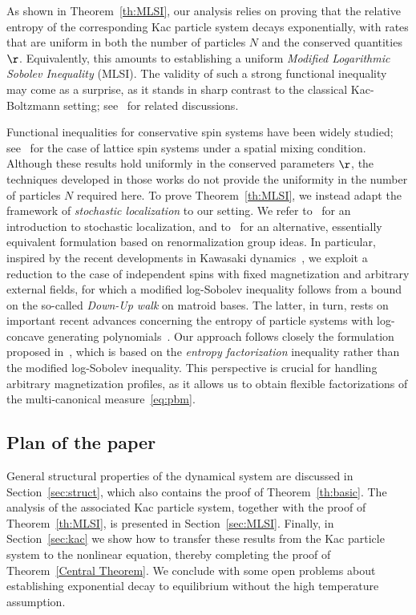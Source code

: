 \documentclass[11pt,reqno]{amsart}
\numberwithin{equation}{section}
\numberwithin{figure}{section}
\newcommand{\1}{\mathds{1}}
\begin{document}

As shown in Theorem~\ref{th:MLSI}, our analysis relies on proving that the relative entropy of the corresponding Kac particle system decays exponentially, with rates that are uniform in both the number of particles $N$ and the conserved quantities $\r$.  
Equivalently, this amounts to establishing a uniform \emph{Modified Logarithmic Sobolev Inequality} (MLSI).  
The validity of such a strong functional inequality may come as a surprise, as it stands in sharp contrast to the classical Kac-Boltzmann setting; see~\cite{Vill2,entfound,kacsprog,Bonetto2018} for related discussions.  

Functional inequalities for conservative spin systems have been widely studied; see~\cite{Yau,MCR} for the case of lattice spin systems under a spatial mixing condition.  
Although these results hold uniformly in the conserved parameters $\r$, the techniques developed in those works do not provide the uniformity in the number of particles $N$ required here.  
To prove Theorem~\ref{th:MLSI}, we instead adapt the framework of \emph{stochastic localization} to our setting.  
We refer to~\cite{chen2022localization} for an introduction to stochastic localization, and to~\cite{bauerschmidt2024polchinsky} for an alternative, essentially equivalent formulation based on renormalization group ideas.  
In particular, inspired by the recent developments in Kawasaki dynamics~\cite{bauerschmidt2024kawasaki}, we exploit a reduction to the case of independent spins with fixed magnetization and arbitrary external fields, for which a modified log-Sobolev inequality follows from a bound on the so-called \emph{Down-Up walk} on matroid bases.  
The latter, in turn, rests on important recent advances concerning the entropy of particle systems with log-concave generating polynomials~\cite{CGM,EntInd22}.  
Our approach follows closely the formulation proposed in~\cite{caputo2025factorizations}, which is based on the \emph{entropy factorization} inequality rather than the modified log-Sobolev inequality.  
This perspective is crucial for handling arbitrary magnetization profiles, as it allows us to obtain flexible factorizations of the multi-canonical measure~\eqref{eq:pbm}.  


\subsection{Plan of the paper}
General structural properties of the dynamical system are discussed in Section~\ref{sec:struct}, which also contains  the proof of Theorem~\ref{th:basic}.  
The analysis of the associated Kac particle system, together with the proof of Theorem~\ref{th:MLSI}, is presented in Section~\ref{sec:MLSI}.  
Finally, in Section~\ref{sec:kac} we show how to transfer these results from the Kac particle system to the nonlinear equation, thereby completing the proof of Theorem~\ref{Central Theorem}. We conclude with some open problems about establishing exponential decay to equilibrium without the high temperature assumption. 
\end{document}
